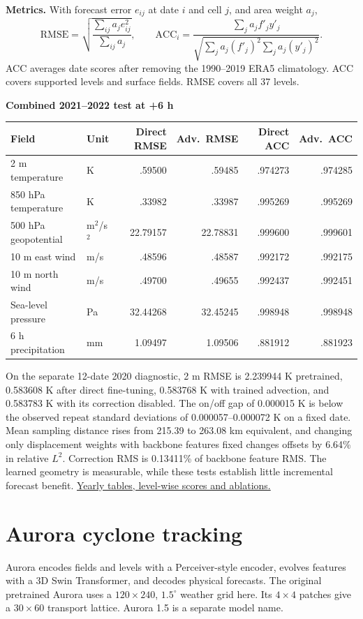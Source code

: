 \documentclass[10pt,a4paper]{article}
\begin{document}
\textbf{Metrics.} With forecast error \(e_{ij}\) at date \(i\) and cell \(j\), and area weight \(a_j\),
\[
 \mathrm{RMSE}=\sqrt{\frac{\sum_{ij}a_j e_{ij}^2}{\sum_{ij}a_j}},\qquad
 \mathrm{ACC}_i=\frac{\sum_j a_j f'_j y'_j}{\sqrt{\sum_j a_j(f'_j)^2\sum_j a_j(y'_j)^2}}.
\]
ACC averages date scores after removing the 1990--2019 ERA5 climatology. ACC covers supported levels and surface fields. RMSE covers all 37 levels.

\begin{center}
\textbf{Combined 2021--2022 test at +6 h}\\[3pt]
\begin{tabular}{@{}llrrrr@{}}
\toprule Field & Unit & Direct RMSE & Adv.\ RMSE & Direct ACC & Adv.\ ACC\\\midrule
2 m temperature & K & .59500 & .59485 & .974273 & .974285\\
850 hPa temperature & K & .33982 & .33987 & .995269 & .995269\\
500 hPa geopotential & m$^2$/s$^2$ & 22.79157 & 22.78831 & .999600 & .999601\\
10 m east wind & m/s & .48596 & .48587 & .992172 & .992175\\
10 m north wind & m/s & .49700 & .49655 & .992437 & .992451\\
Sea-level pressure & Pa & 32.44268 & 32.45245 & .998948 & .998948\\
6 h precipitation & mm & 1.09497 & 1.09506 & .881912 & .881923\\\bottomrule
\end{tabular}
\end{center}
On the separate 12-date 2020 diagnostic, 2 m RMSE is 2.239944 K pretrained, 0.583608 K after direct fine-tuning, 0.583768 K with trained advection, and 0.583783 K with its correction disabled. The on/off gap of 0.000015 K is below the observed repeat standard deviations of 0.000057--0.000072 K on a fixed date. Mean sampling distance rises from 215.39 to 263.08 km equivalent, and changing only displacement weights with backbone features fixed changes offsets by 6.64\% in relative \(L^2\). Correction RMS is 0.13411\% of backbone feature RMS. The learned geometry is measurable, while these tests establish little incremental forecast benefit. \href{https://github.com/Xavaitron/Weather_foundational_model/tree/e348e2a/graphcast-weather/results}{Yearly tables, level-wise scores and ablations.}

\newpage
\section{Aurora cyclone tracking}
Aurora \cite{aurora} encodes fields and levels with a Perceiver-style encoder, evolves features with a 3D Swin Transformer, and decodes physical forecasts. The original pretrained Aurora uses a \(120\times240\), \(1.5^\circ\) weather grid here. Its \(4\times4\) patches give a \(30\times60\) transport lattice. Aurora 1.5 is a separate model name.
\end{document}
